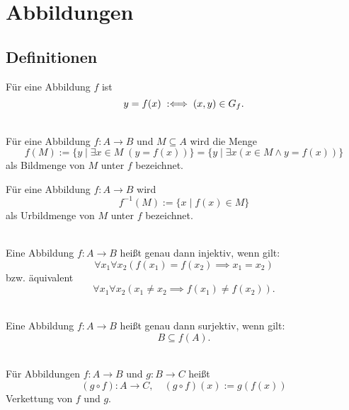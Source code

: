 \newpage
\section{Abbildungen}
\subsection{Definitionen}

\begin{Definition}\label{def:app}
Für eine Abbildung $f$ ist
\[y=f(x)\;:\Longleftrightarrow\; (x,y)\in G_f.\]
\end{Definition}

\begin{Definition}%
\label{def:img}\mbox{}\\
Für eine Abbildung $f\colon A\to B$ und $M\subseteq A$
wird die Menge
\[f(M) := \{y\mid \exists x{\in}M\;(y=f(x))\}
= \{y\mid \exists x(x\in M\land y=f(x))\}\]
als Bildmenge von $M$ unter $f$ bezeichnet.
\end{Definition}

\begin{Definition}\label{def:preimg}
Für eine Abbildung $f\colon A\to B$ wird
\[f^{-1}(M) := \{x\mid f(x)\in M\}\]
als Urbildmenge von $M$ unter $f$ bezeichnet.
\end{Definition}

\begin{Definition}%
\label{def:inj}\mbox{}\\
Eine Abbildung $f\colon A\to B$ heißt genau dann injektiv, wenn gilt:
\[\forall x_1\forall x_2(f(x_1)=f(x_2)\implies x_1=x_2)\]
bzw. äquivalent
\[\forall x_1\forall x_2(x_1\ne x_2\implies f(x_1)\ne f(x_2)).\]
\end{Definition}

\begin{Definition}%
\label{def:sur}\mbox{}\\
Eine Abbildung $f\colon A\to B$ heißt genau dann surjektiv, wenn gilt:
\[B\subseteq f(A).\]
\end{Definition}

\begin{Definition}\label{def:composition}%
\mbox{}\\
Für Abbildungen $f\colon A\to B$ und $g\colon B\to C$ heißt
\[(g\circ f)\colon A\to C,\quad (g\circ f)(x):=g(f(x))\]
Verkettung von $f$ und $g$.
\end{Definition}

